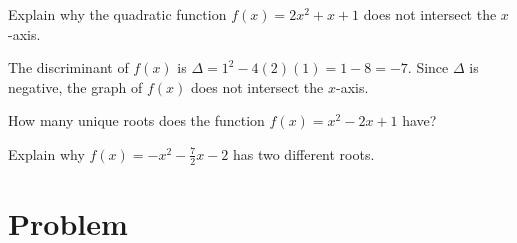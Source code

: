 \documentclass[a4paper,oneside,12pt]{article}
\begin{document}
\begin{example}
Explain why the quadratic function $f(x) = 2x^2 + x + 1$ does not
intersect the $x$-axis.
\end{example}

\begin{solution}
The discriminant of $f(x)$ is
$\Delta = 1^2 - 4(2)(1) = 1 - 8 = -7$.  Since $\Delta$ is negative,
the graph of $f(x)$ does not intersect the $x$-axis.
\end{solution}

\begin{exercise}
How many unique roots does the function $f(x) = x^2 - 2x + 1$ have?
\end{exercise}

\begin{exercise}
Explain why $f(x) = -x^2 - \frac{7}{2}x - 2$ has two different roots.
\end{exercise}



\section*{Problem}
\end{document}
